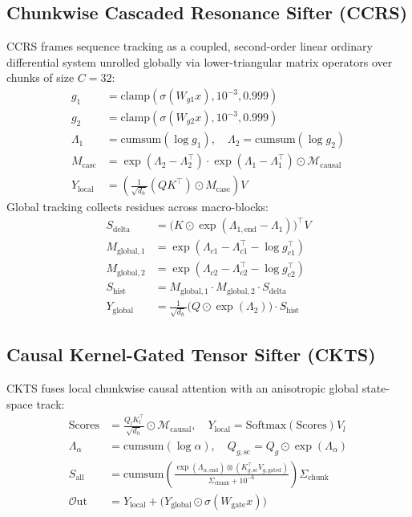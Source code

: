 \documentclass[twocolumn,10pt]{article}
\begin{document}
\subsection{Chunkwise Cascaded Resonance Sifter (CCRS)}
CCRS frames sequence tracking as a coupled, second-order linear ordinary differential system unrolled globally via lower-triangular matrix operators over chunks of size $C=32$:
\begin{align*}
g_1 &= \text{clamp}(\sigma(W_{g1} x), 10^{-3}, 0.999) \\
g_2 &= \text{clamp}(\sigma(W_{g2} x), 10^{-3}, 0.999) \\
\Lambda_1 &= \text{cumsum}(\log g_1), \quad \Lambda_2 = \text{cumsum}(\log g_2) \\
M_{\text{casc}} &= \exp(\Lambda_2 - \Lambda_2^\top) \cdot \exp(\Lambda_1 - \Lambda_1^\top) \odot \mathcal{M}_{\text{causal}} \\
Y_{\text{local}} &= \left( \frac{1}{\sqrt{d_h}} (Q K^\top) \odot M_{\text{casc}} \right) V
\end{align*}
Global tracking collects residues across macro-blocks:
\begin{align*}
S_{\text{delta}} &= \big(K \odot \exp(\Lambda_{1,\text{end}} - \Lambda_1)\big)^\top V \\
M_{\text{global},1} &= \exp(\Lambda_{c1} - \Lambda_{c1}^\top - \log g_{c1}^\top) \\
M_{\text{global},2} &= \exp(\Lambda_{c2} - \Lambda_{c2}^\top - \log g_{c2}^\top) \\
S_{\text{hist}} &= M_{\text{global},1} \cdot M_{\text{global},2} \cdot S_{\text{delta}} \\
Y_{\text{global}} &= \frac{1}{\sqrt{d_h}} \big(Q \odot \exp(\Lambda_2)\big) \cdot S_{\text{hist}}
\end{align*}

\subsection{Causal Kernel-Gated Tensor Sifter (CKTS)}
CKTS fuses local chunkwise causal attention with an anisotropic global state-space track:
\begin{align*}
\text{Scores} &= \frac{Q_l K_l^\top}{\sqrt{d_h}} \odot \mathcal{M}_{\text{causal}}, \quad Y_{\text{local}} = \text{Softmax}(\text{Scores}) V_l \\
\Lambda_\alpha &= \text{cumsum}(\log \alpha), \quad Q_{g,\text{sc}} = Q_g \odot \exp(\Lambda_\alpha) \\
S_{\text{all}} &= \text{cumsum}\!\left( \frac{\exp(\Lambda_{\alpha,\text{end}}) \otimes (K_{g,\text{sc}}^\top V_{g,\text{gated}})}{\Sigma_{\text{chunk}} + 10^{-6}} \right) \Sigma_{\text{chunk}} \\
\mathcal{O}\text{ut} &= Y_{\text{local}} + \big(Y_{\text{global}} \odot \sigma(W_{\text{gate}} x)\big)
\end{align*}
\end{document}
